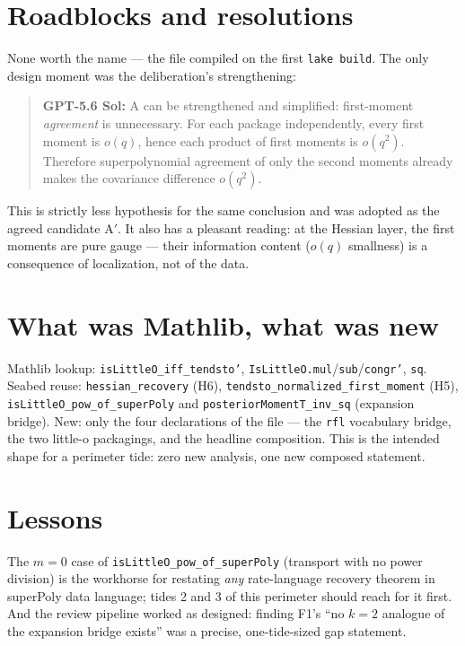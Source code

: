 \documentclass[11pt]{article}
\newcommand{\gptbox}[1]{\par\medskip\begin{quote}\small\textbf{\textcolor{green!50!black}{GPT-5.6 Sol:}} #1\end{quote}\medskip}
\begin{document}
\section{Roadblocks and resolutions}

None worth the name --- the file compiled on the first \texttt{lake build}.
The only design moment was the deliberation's strengthening:

\gptbox{A can be strengthened and simplified: first-moment
\emph{agreement} is unnecessary. For each package independently, every
first moment is $o(q)$, hence each product of first moments is $o(q^2)$.
Therefore superpolynomial agreement of only the second moments already
makes the covariance difference $o(q^2)$.}

This is strictly less hypothesis for the same conclusion and was adopted as
the agreed candidate A$'$. It also has a pleasant reading: at the Hessian
layer, the first moments are pure gauge --- their information content
($o(q)$ smallness) is a consequence of localization, not of the data.

\section{What was Mathlib, what was new}

Mathlib lookup: \texttt{isLittleO\_iff\_tendsto'},
\texttt{IsLittleO.mul}/\texttt{sub}/\texttt{congr'}, \texttt{sq}. Seabed
reuse: \texttt{hessian\_recovery} (H6), \texttt{tendsto\_normalized\_first\_moment}
(H5), \texttt{isLittleO\_pow\_of\_superPoly} and
\texttt{posteriorMomentT\_inv\_sq} (expansion bridge). New: only the four
declarations of the file --- the \texttt{rfl} vocabulary bridge, the two
little-o packagings, and the headline composition. This is the intended
shape for a perimeter tide: zero new analysis, one new composed statement.

\section{Lessons}

The $m = 0$ case of \texttt{isLittleO\_pow\_of\_superPoly} (transport with
no power division) is the workhorse for restating \emph{any} rate-language
recovery theorem in superPoly data language; tides 2 and 3 of this
perimeter should reach for it first. And the review pipeline worked as
designed: finding F1's ``no $k=2$ analogue of the expansion bridge exists''
was a precise, one-tide-sized gap statement.
\end{document}
